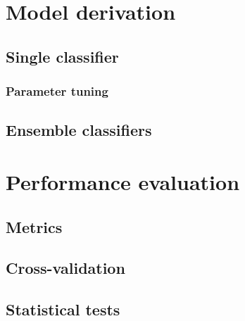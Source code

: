 \section{Model derivation}

\subsection{Single classifier}

\subsubsection{Parameter tuning}

\subsection{Ensemble classifiers}

\section{Performance evaluation}

\subsection{Metrics}

\subsection{Cross-validation}

\subsection{Statistical tests}
